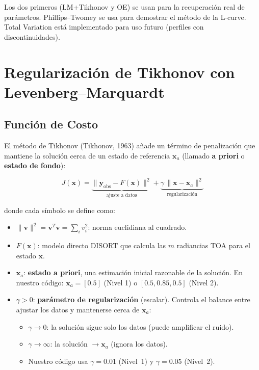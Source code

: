 \documentclass[a4paper,11pt]{article}
\begin{document}
Los dos primeros (LM+Tikhonov y OE) se usan para la recuperaci\'on real de
par\'ametros.  Phillips--Twomey se usa para demostrar el m\'etodo de la
L-curve.  Total Variation est\'a implementado para uso futuro (perfiles con
discontinuidades).

\section{Regularizaci\'on de Tikhonov con Levenberg--Marquardt}
\label{sec:tikhonov}

\subsection{Funci\'on de Costo}

El m\'etodo de Tikhonov (Tikhonov, 1963) a\~nade un t\'ermino de
penalizaci\'on que mantiene la soluci\'on cerca de un estado de referencia
$\mathbf{x}_a$ (llamado \textbf{a priori} o \textbf{estado de fondo}):

\begin{equation}\label{eq:cost_tikhonov}
    \boxed{J(\mathbf{x}) = \underbrace{\|\mathbf{y}_{\text{obs}} - F(\mathbf{x})\|^2}_{\text{ajuste a datos}}
    + \underbrace{\gamma\,\|\mathbf{x} - \mathbf{x}_a\|^2}_{\text{regularizaci\'on}}}
\end{equation}

donde cada s\'imbolo se define como:
\begin{itemize}
    \item $\|\mathbf{v}\|^2 = \mathbf{v}^T\mathbf{v} = \sum_i v_i^2$:
          norma euclidiana al cuadrado.
    \item $F(\mathbf{x})$: modelo directo DISORT que calcula las $m$ radiancias
          TOA para el estado $\mathbf{x}$.
    \item $\mathbf{x}_a$: \textbf{estado a priori}, una estimaci\'on inicial
          razonable de la soluci\'on.  En nuestro c\'odigo:
          $\mathbf{x}_a = [0.5]$ (Nivel 1) o $[0.5, 0.85, 0.5]$ (Nivel 2).
    \item $\gamma > 0$: \textbf{par\'ametro de regularizaci\'on} (escalar).
          Controla el balance entre ajustar los datos y mantenerse cerca de
          $\mathbf{x}_a$:
          \begin{itemize}
              \item $\gamma \to 0$: la soluci\'on sigue solo los datos
                    (puede amplificar el ruido).
              \item $\gamma \to \infty$: la soluci\'on $\to \mathbf{x}_a$
                    (ignora los datos).
              \item Nuestro c\'odigo usa $\gamma = 0.01$ (Nivel~1) y
                    $\gamma = 0.05$ (Nivel~2).
          \end{itemize}
\end{itemize}
\end{document}

